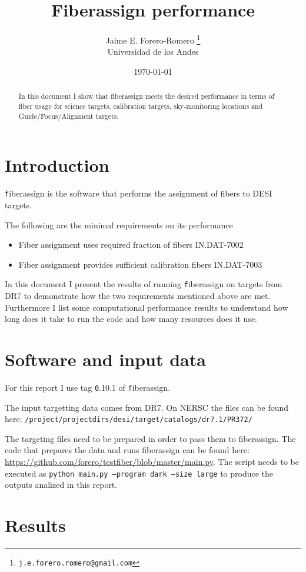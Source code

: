 \documentclass{article}
\title{Fiberassign performance}
\author{Jaime E. Forero-Romero \footnote{{\texttt{j.e.forero.romero@gmail.com}}}\\Universidad de los Andes}
\date{\today}
\begin{document}
\maketitle
\begin{abstract}
In this document I show that fiberassign meets the desired performance
in terms of fiber usage for science targets, calibration targets,
sky-monitoring locations and Guide/Focus/Alignment targets. 
\end{abstract}

\section{Introduction}
{\texttt fiberassign} is the software that performs the assignment of
fibers to DESI targets. 

The following are the minimal requirements on its performance
\begin{itemize}
\item Fiber assignment uses required fraction of fibers IN.DAT-7002
\item Fiber assignment provides sufficient calibration fibers IN.DAT-7003
\end{itemize}
In this document I present the results of running {\texttt
  fiberassign} on targets from DR7 to demonstrate how the two
requirements mentioned above are met. 
Furthermore I list some computational performance results to
understand how long does it take to run the code and how many
resources does it use.

\section{Software and input data}

For this report I use tag {\texttt 0.10.1} of {\texttt fiberassign}. 

The input targetting data comes from DR7. On NERSC the files can be found here:
{\texttt{/project/projectdirs/desi/target/catalogs/dr7.1/PR372/}}

The targeting files need to be prepared in order to pass them to
fiberassign.
The code that prepares the data and runs fiberassign can be found
here:
\url{https://github.com/forero/testfiber/blob/master/main.py}.
The script needs to be executed as {\texttt{python main.py --program dark
--size large}} to produce the outputs analized in this report.


\section{Results}
\end{document}
